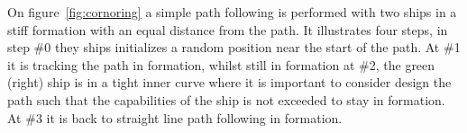 On figure~\vref{fig:cornoring} a simple path following is performed
with two ships in a stiff formation with an equal distance from the
path. It illustrates four steps, in step \#0 they ships initializes a
random position near the start of the path. At \#1 it is tracking the
path in formation, whilst still in formation at \#2, the green
(right) ship is in a tight inner curve where it is important to
consider design the path such that the capabilities of the ship is not
exceeded to stay in formation. At \#3 it is back to straight line path
following in formation.
